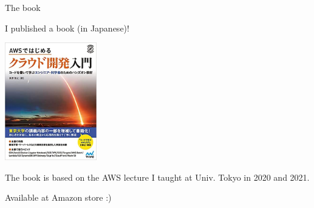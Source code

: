 \documentclass[unicode,11pt]{beamer}
\begin{document}
\begin{frame}{The book}

\centering
I published a book (in Japanese)!

\includegraphics[width=0.3\textwidth]{imgs/book_cover.jpg}

{\small The book is based on the AWS lecture I taught at Univ. Tokyo in 2020 and 2021.}

\vspace{10pt}

Available at Amazon store :)

\end{frame}
\end{document}
